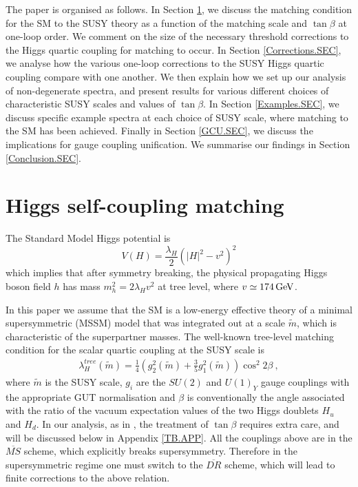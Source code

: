 \documentclass[12pt]{article}
\newcommand{\beq}{\begin{equation}}
\newcommand{\eeq}{\end{equation}}
\newcommand{\MS}{\overline{MS}}
\newcommand{\DR}{\overline{DR}}
\newcommand{\mS}{\tilde{m}}
\newcommand{\gev}{{\, {\rm GeV}}}
\begin{document}
The paper is organised as follows. In Section \ref{Setup.SEC}, we discuss the matching condition for the SM to the SUSY theory as a function of the matching scale and $\tan\beta$ at one-loop order. We comment on the size of the necessary threshold corrections to the Higgs quartic coupling for matching to occur. In Section \ref{Corrections.SEC}, we analyse how the various one-loop corrections to the SUSY Higgs quartic coupling compare with one another. We then explain how we set up our analysis of non-degenerate spectra, and present results for various different choices of characteristic SUSY scales and values of $\tan\beta$. In Section \ref{Examples.SEC}, we discuss specific example spectra at each choice of SUSY scale, where matching to the SM has been achieved. Finally in Section \ref{GCU.SEC}, we discuss the implications for gauge coupling unification. We summarise our findings in Section \ref{Conclusion.SEC}.

\section{Higgs self-coupling matching}
\label{Setup.SEC}

The Standard Model Higgs potential is
\beq
V(H)=\frac{\lambda_H}{2} \left( |H|^2-v^2 \right)^2
\eeq
which implies that after symmetry breaking, the physical propagating Higgs boson field $h$ has mass $m_h^2=2\lambda_H v^2$ at tree level, where $v\simeq 174\gev$. 

In this paper we assume that the SM is a low-energy effective theory of a minimal supersymmetric (MSSM) model that was integrated out at a scale $\mS$, which is characteristic of the superpartner masses. 
The well-known tree-level matching condition for the scalar quartic coupling at the SUSY scale is
\begin{align}
\lambda^{tree}_H(\mS) = \frac{1}{4}\left( g_2^2(\mS) + \frac{3}{5}g_1^2(\mS) \right) \cos^2 2\beta \ ,
\label{TreeLambda.EQ}
\end{align}
where $\mS$ is the SUSY scale, $g_i$ are the $SU(2)$ and $U(1)_Y$ gauge couplings with the appropriate GUT normalisation and $\beta$ is conventionally the angle associated with the ratio of the vacuum expectation values of the two Higgs doublets $H_u$ and $H_d$. In our analysis, as in \cite{Bagnaschi:2014rsa}, the treatment of $\tan\beta$ requires extra care, and will be discussed below in Appendix \ref{TB.APP}. All the couplings above are in the $\MS$ scheme, which explicitly breaks supersymmetry. Therefore in the supersymmetric regime one must switch to the $\DR$ scheme, which will lead to finite corrections to the above relation.
\end{document}
